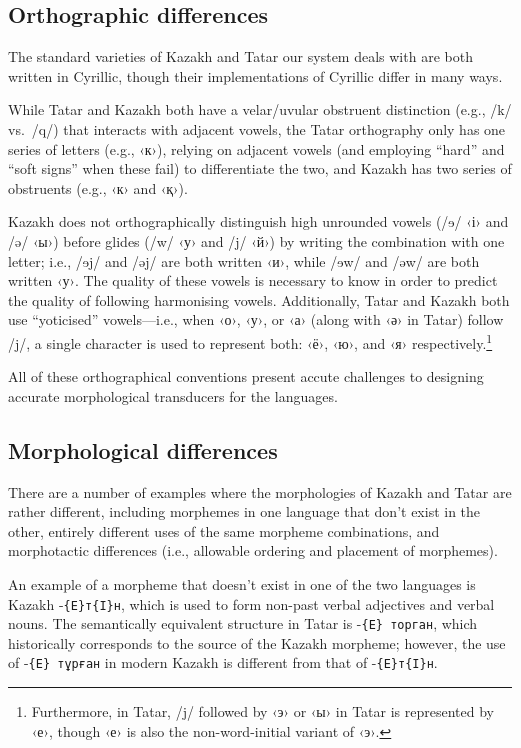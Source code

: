 \documentclass[11pt]{article}
\begin{document}
\subsection{Orthographic differences}
The standard varieties of Kazakh and Tatar our system deals with are both written in Cyrillic, though their implementations of Cyrillic differ in many ways.

While Tatar and Kazakh both have a velar/uvular obstruent distinction (e.g., /k/ vs.\ /q/) that interacts with adjacent vowels, the Tatar orthography only has one series of letters (e.g., ‹к›), relying on adjacent vowels (and employing ``hard'' and ``soft signs'' when these fail) to differentiate the two, and Kazakh has two series of obstruents (e.g., ‹к› and ‹қ›).

Kazakh does not orthographically distinguish high unrounded vowels (/{\qipa ɘ}/ ‹і› and /ə/ ‹ы›) before glides (/w/ ‹у› and /j/ ‹й›) by writing the combination with one letter; i.e., /{\qipa ɘ}j/ and /əj/ are both written ‹и›, while /{\qipa ɘ}w/ and /əw/ are both written ‹у›.  The quality of these vowels is necessary to know in order to predict the quality of following harmonising vowels. %
Additionally, Tatar and Kazakh both use ``yoticised'' vowels---i.e., when ‹о›, ‹у›, or ‹а› (along with ‹ә› in Tatar) follow /j/, a single character is used to represent both: ‹ё›, ‹ю›, and ‹я› respectively.\footnote{Furthermore, in Tatar, /j/ followed by ‹э› or ‹ы› in Tatar is represented by ‹е›, though ‹е› is also the non-word-initial variant of ‹э›.}  %

All of these orthographical conventions present accute challenges to designing accurate morphological transducers for the languages.

\subsection{Morphological differences}
There are a number of examples where the morphologies of Kazakh and Tatar are rather different, including morphemes in one language that don't exist in the other, entirely different uses of the same morpheme combinations, and morphotactic differences (i.e., allowable ordering and placement of morphemes).

An example of a morpheme that doesn't exist in one of the two languages is Kazakh -\texttt{\{E\}т\{I\}н}, which is used to form non-past verbal adjectives and verbal nouns.  The semantically equivalent structure in Tatar is -\texttt{\{E\} торган}, which historically corresponds to the source of the Kazakh morpheme; however, the use of -\texttt{\{E\} тұрған} in modern Kazakh is different from that of -\texttt{\{E\}т\{I\}н}.
\end{document}
